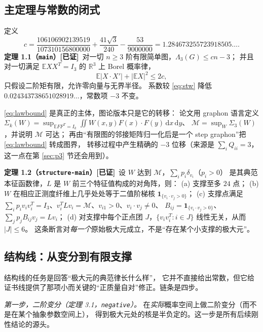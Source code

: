 \documentclass[UTF8,11pt]{ctexart}
\newcommand{\Lam}{\Lambda}
\newcommand{\R}{\mathbb{R}}
\newcommand{\E}{\mathbb{E}}
\newcommand{\M}{\mathcal{M}}
\newcommand{\dd}{\,\mathrm{d}}
\newcommand{\file}[1]{\texttt{#1}}
\newcommand{\ok}{\textcolor[rgb]{0.05,0.45,0.15}{\bfseries [已证]}}
\begin{document}
\subsection{主定理与常数的闭式}

定义
\begin{equation}\label{eq:c}
 c=\frac{106106902139519}{107310156800000}+\frac{41\sqrt3}{240}-\frac{53}{9000000}
   =1.284673255723918505\ldots .
\end{equation}
\textbf{定理 1.1（\file{main}）}\ok\ 对一切 $n\ge3$ 阶有限简单图，$\Lam_3(G)\le cn-3$；
并且对一切满足 $\E XX^T=I_3$ 的 $\R^3$ 上 Borel 概率律，
\begin{equation}\label{eq:lawbound}
 \E|X\cdot X'|+|\E X|^2\le 2c ,
\end{equation}
只假设二阶矩有限，允许零向量与无界半径。
系数较 \eqref{eq:stw} 降低 $0.024343738651028919\ldots$，常数项 $-3$ 不变。

\eqref{eq:lawbound} 是真正的主体，图论版本只是它的转移：
论文用 graphon 语言定义
$\Sigma_k(W)=\sup_{\E FF^T=I_k}\iint W(x,y)F(x)\cdot F(y)\dd x\dd y$、
$\M=\sup_W\Sigma_3(W)$，并说明 $\M$ 可达；
再由``有限图的邻接矩阵归一化后是一个 step graphon''把 \eqref{eq:lawbound} 转成图界，
转移过程中产生精确的 $-3$ 位移（来源是 $\sum_i Q_{ii}=3$，这一点在第 \ref{sec:p3} 节还会用到）。

\textbf{定理 1.2（\file{structure-main}）}\ok\ 设 $W$ 达到 $\M$，$\sum_i p_i\delta_{v_i}$（$p_i>0$）
是其典范本征函数律，$L$ 是 $W$ 前三个特征值构成的对角阵，则：
(a) 支撑至多 $24$ 点；
(b) $W$ 在相应正测度纤维上几乎处处等于二值阶梯核 $\mathbf 1_{\{v_i\cdot v_j>0\}}$；
(c) 支撑点满足 $\sum_i p_iv_iv_i^T=I_3$、$v_i^TLv_i=\M$、$v_{i1}>0$、$v_i\cdot v_j\ne0$、
$B_{ij}=\mathbf 1_{\{v_i\cdot v_j>0\}}$、$\sum_jp_jB_{ij}v_j=Lv_i$；
(d) 对支撑中每个正点团 $J$，$\{v_iv_i^T:i\in J\}$ 线性无关，从而 $|J|\le6$。
这条断言对\emph{每一个}原始极大元成立，不是``存在某个小支撑的极大元''。

\subsection{结构线：从变分到有限支撑}

结构线的任务是回答``极大元的典范律长什么样''，
它并不直接给出常数，但它给证书线提供了那项小而关键的``正质量自对''修正。链条是四步。

\emph{第一步，二阶变分（定理 3.1，\file{negative}）。}
在\emph{实际}概率空间上做二阶变分（而不是在某个抽象参数空间上），
得到极大元处的核是半负定的。这一步是所有后续刚性结论的源头。
\end{document}
